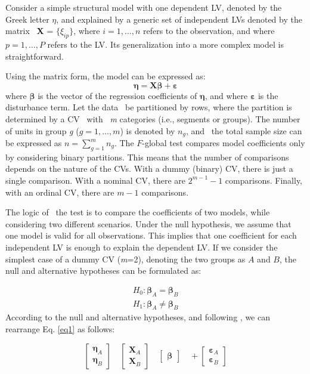 Consider a simple structural model with one dependent LV, denoted by the Greek letter \textbf{$\eta$}, and explained by a generic set of independent LVs denoted by the matrix  \textbf{X} = $\{\xi_{ip}\}$, where $i = 1, \ldots, n$ refers to the observation, and where $p = 1, \ldots, P$ refers to the LV. Its generalization into a more complex model is straightforward. 

Using the matrix form, the model can be expressed as: 
\begin{equation}
\label{eq1}
\boldsymbol{\eta} = \textbf{X}\boldsymbol{\beta} + \boldsymbol{\varepsilon}
\end{equation}
where $\boldsymbol{\beta}$ is the vector  of the regression coefficients of $\boldsymbol{\eta}$, and where $\boldsymbol{\varepsilon}$ is the disturbance term. Let the data  be partitioned by rows, where the partition is determined by a CV  with  \textit{m} categories (i.e., segments or groups). The number of units in group \textit{g} ($g=1,\ldots, m$) is denoted by $n_g$, and  the total sample size can be expressed as $n=\sum_{g=1}^m n_g$.
The $F$-global test compares model coefficients only by considering binary partitions. This means that the number of comparisons depends on the nature of the CVs. With a dummy (binary) CV, there is just a single comparison.  With a nominal CV, there are $2^{m-1}-1$ comparisons. Finally, with an ordinal CV, there are $m-1$ comparisons.

The logic of  the test is to compare the coefficients of two models, while considering two different scenarios. Under the null hypothesis, we assume that one model is valid for all observations. This implies  that one coefficient for each independent LV is enough to explain the dependent LV.  If we  consider the simplest case of a dummy CV (\textit{m}=2), denoting the two groups as $A$ and $B$, the null and alternative hypotheses can be formulated as:

\begin{align}
\label{eq2}
H_0: \boldsymbol{\beta}_A = \boldsymbol{\beta}_B \\
H_1: \boldsymbol{\beta}_A \ne \boldsymbol{\beta}_B
\end{align}
According  to the null and alternative hypotheses, and following \citet{Lebart79},  we can rearrange Eq. \ref{eq1} as follows:  

\begin{equation}
\label{eq22}
\left[\begin{array}{l}
\boldsymbol{\eta}_A \\
\boldsymbol{\eta}_B 
\end{array}\right] \quad
\left[\begin{array}{l}
\textbf{X}_A \\
\textbf{X}_B 
\end{array}\right] \quad
\left[\begin{array}{l}
\boldsymbol{\beta}
\end{array}\right]  \quad +
\left[\begin{array}{l}
\boldsymbol{\varepsilon}_A \\
\boldsymbol{\varepsilon}_B 
\end{array}\right] 
\end{equation}

